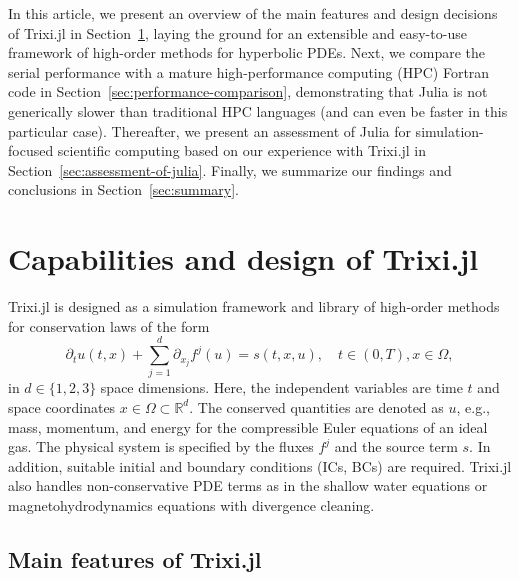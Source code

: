 \documentclass[hidelinks]{juliacon} %
\makeatletter
\newcommand{\eg}[0]{{e.g.\@}\xspace}
\newcommand{\trixi}{Trixi.jl\xspace}
\makeatother
\begin{document}
In this article, we present an overview of the main features and design decisions
of \trixi in Section~\ref{sec:design-of-trixi}, laying the ground for an extensible
and easy-to-use framework of high-order methods for hyperbolic PDEs. Next, we
compare the serial performance with a mature high-performance computing (HPC) Fortran code in
Section~\ref{sec:performance-comparison}, demonstrating that Julia is not generically
slower than traditional HPC languages (and can even be faster in this particular case).
Thereafter, we present an assessment of Julia for simulation-focused scientific
computing based on our experience with \trixi in Section~\ref{sec:assessment-of-julia}.
Finally, we summarize our findings and conclusions in Section~\ref{sec:summary}.



\section{Capabilities and design of Trixi.jl}
\label{sec:design-of-trixi}

\trixi is designed as a simulation framework and library of high-order methods for conservation laws
of the form
\begin{equation}
\label{eq:hcl}
  \partial_t u(t, x) + \sum_{j=1}^d \partial_{x_j} f^j(u) = s(t, x, u),
  \quad t \in (0, T), x \in \Omega,
\end{equation}
in $d \in \{1, 2, 3\}$ space dimensions. Here, the independent variables are
time $t$ and space coordinates $x \in \Omega \subset \mathbb{R}^d$. The conserved
quantities are denoted as $u$, \eg, mass, momentum, and energy for the compressible
Euler equations of an ideal gas.
The physical system is specified by the fluxes $f^j$ and the source term $s$.
In addition, suitable initial and boundary conditions (ICs, BCs) are required.
\trixi also handles non-conservative PDE terms as in the shallow water equations or magnetohydrodynamics equations
with divergence cleaning.


\subsection{Main features of Trixi.jl}
\end{document}
